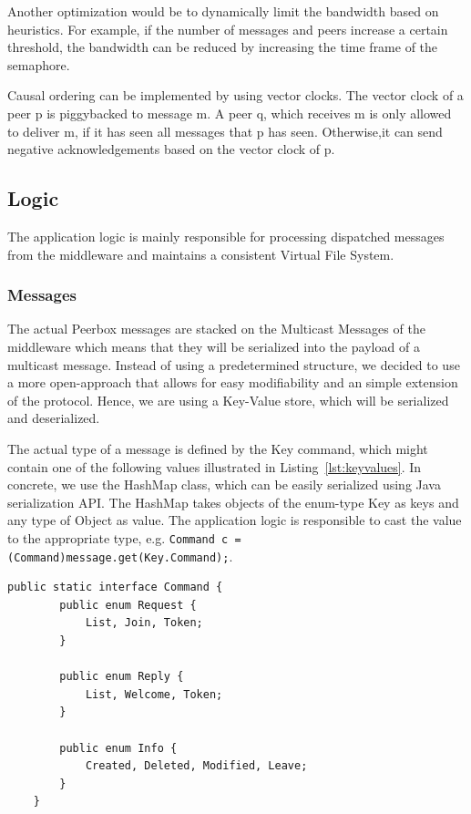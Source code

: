 Another optimization would be to dynamically limit the bandwidth based on heuristics. For example, if the number of messages and peers increase a certain threshold, the bandwidth can be reduced by increasing the time frame of the semaphore. 

Causal ordering can be implemented by using vector clocks. The vector clock of a peer p is piggybacked to message m. A peer q, which receives m is only allowed to deliver m, if it has seen all messages that p has seen. Otherwise,it can send negative acknowledgements based on the vector clock of p. 

\subsection{Logic}
The application logic is mainly responsible for processing dispatched messages from the middleware and maintains a consistent Virtual File System.
    
    \subsubsection{Messages}   
The actual Peerbox messages are stacked on the Multicast Messages of the middleware which means that they will be serialized into the payload of a multicast message. 
Instead of using a predetermined structure, we decided to use a more open-approach that allows for easy modifiability and an simple extension of the protocol. Hence, we are using a Key-Value store, which will be serialized and deserialized. 

The actual type of a message is defined by the Key command, which might contain one of the following values illustrated in Listing~\ref{lst:keyvalues}. In concrete, we use the HashMap class, which can be easily serialized using Java serialization API.  The HashMap takes objects of the enum-type Key as keys and any type of Object as value. The application logic is responsible to cast the value to the appropriate type, e.g. \verb|Command c = (Command)message.get(Key.Command);|.

\begin{lstlisting}[caption=Possible values of command, label=lst:keyvalues]
public static interface Command {
		public enum Request {
			List, Join, Token;
		}

		public enum Reply {
			List, Welcome, Token;
		}

		public enum Info {
			Created, Deleted, Modified, Leave;
		}
	}
\end{lstlisting}

